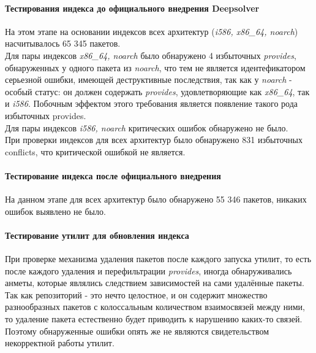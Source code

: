 \paragraph{Тестирования индекса до официального внедрения Deepsolver\\}
На этом этапе на основании индексов всех архитектур (\textit{i586, x86\_64, noarch})
насчитывалось 65 345 пакетов.\\
Для пары индексов  \textit{x86\_64, noarch} было обнаружено 4 избыточных \textit{provides}, 
обнаруженных у одного пакета из \textit{noarch}, что тем не является идентефикатором серьезной
ошибки, имеющей деструктивные последствия, так как у \textit{noarch} - особый статус: он должен
содержать \textit{provides}, удовлетворяющие как \textit{x86\_64}, так и \textit{i586}. Побочным
эффектом этого требования является появление такого рода избыточных provides.\\
Для пары индексов \textit{i586, noarch} критических ошибок обнаружено не было.\\
При проверки индексов для всех архитектур было обнаружено 831 избыточных conflicts, что
критической ошибкой не является.\\

\paragraph{Тестирование индекса после официального внедрения\\}
На данном этапе для всех архитектур было обнаружено 55 346 пакетов, никаких
ошибок выявлено не было.\\

\paragraph{Тестирование утилит для обновления индекса}
При проверке механизма удаления пакетов после каждого  запуска утилит, то есть
после каждого удаления и перефильтрации \textit{provides}, иногда обнаруживались
анметы, которые являлись следствием зависимостей на сами удалённые пакеты. Так 
как репозиторий - это нечто целостное, и он содержит множество разнообразных пакетов
с колоссальным количеством взаимосвязей между ними, то удаление пакета
естественно будет приводить к нарушению каких-то связей. Поэтому обнаруженные ошибки
опять же не являются свидетельством некорректной работы утилит.













